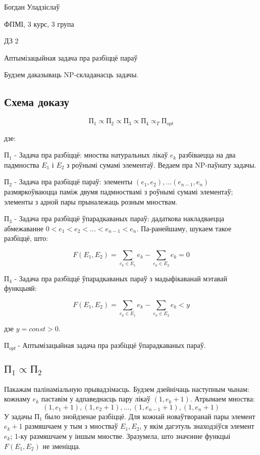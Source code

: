 \documentclass{article}
\newcommand{\opt}{${\text{П}}_{opt}\ $}
\begin{document}
{\large

Богдан Уладзіслаў

ФПМІ, 3 курс, 3 група

\vspace{5mm}

ДЗ 2

Аптымізацыйная задача пра разбіццё параў

}

\vspace{15mm}

Будзем даказываць NP-складанасць задачы.

\subsection*{Схема доказу}

\[
{\text{П}}_{1} \propto {\text{П}}_{2} \propto {\text{П}}_{3} \propto {\text{П}}_{4} \propto_{T} {\text{П}}_{opt}
\]

дзе:

${\text{П}}_{1}$ - Задача пра разбіццё: мноства натуральных лікаў $e_k$ разбіваецца на два
падмноства $E_1$ і $E_2$ з роўнымі сумамі элементаў. Ведаем пра NP-паўнату
задачы.

${\text{П}}_{2}$ - Задача пра разбіццё параў: элементы $(e_1, e_2), ... (e_{n-1}, e_n)$
размяркоўваюцца паміж двумя падмноствамі з роўнымі сумамі элементаў; элементы з
адной пары прыналежаць розным мноствам.

${\text{П}}_{3}$ - Задача пра разбіццё ўпарадкаваных параў: дадаткова накладваецца
абмежаванне $0 < e_1 < e_2 < ... < e_{n-1} < e_n$. Па-ранейшаму, шукаем такое
разбіццё, што:

\[
F(E_1, E_2) = \sum_{e_k \in E_1}{e_k} - \sum_{e_k \in E_2}{e_k} = 0
\]

${\text{П}}_{4}$ - Задача пра разбіццё ўпарадкаваных параў з мадыфікаванай мэтавай
функцыяй:

\[
F(E_1, E_2) = \sum_{e_k \in E_1}{e_k} - \sum_{e_k \in E_2}{e_k} < y
\]

дзе $y = const > 0$.

\opt - Аптымізацыйная задача пра разбіццё ўпарадкаваных параў.

\subsection*{${\text{П}}_{1} \propto {\text{П}}_{2}$}

Пакажам палінаміальную прывадзімасць. Будзем дзейнічаць наступным чынам:
кожнаму $e_k$ паставім у адпаведнасць пару лікаў $(1, e_k+1)$. Атрымаем мноства:
\[
    (1, e_1+1), (1, e_2+1), ... , (1, e_{n-1}+1), (1, e_n+1)
\]
У задачы ${\text{П}}_{1}$ было знойдзенае разбіццё. Для кожнай новаўтворанай
пары элемент $e_k+1$ размяшчаем у тым з мностваў $E_1, E_2$, у якім дагэтуль
знаходзіўся элемент $e_k$; 1-ку размяшчаем у іншым мностве. Зразумела, што
значэнне функцыі $F(E_1, E_2)$ не зменіцца.
\end{document}
